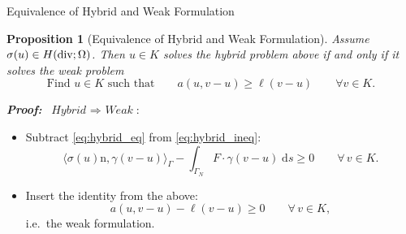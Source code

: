 \documentclass[10pt,aspectratio=169]{beamer}
\newtheorem{proposition}{Proposition}[section]
\def\d{{\mathrm{d}}}
\def\ds{{\d s}}
\newcommand{\diver}{\operatornamewithlimits{div}}
\begin{document}
\begin{frame}{Equivalence of Hybrid and Weak Formulation}
	\begin{proposition}[Equivalence of Hybrid and Weak Formulation]
		Assume $\sigma(u)\in H(\diver;\Omega)$. Then $u\in K$ solves the hybrid problem above if and only if it solves the weak problem
		\begin{equation*}
			\text{Find }u\in K\text{ such that}\qquad a(u,v-u)\ge\ell(v-u)\qquad \forall v\in K.
		\end{equation*}
	\end{proposition}
	\textbf{\em Proof:} $\ \textit{Hybrid }\Rightarrow\textit{ Weak}$:
	\begin{itemize}
		\item Subtract \eqref{eq:hybrid_eq} from \eqref{eq:hybrid_ineq}:
		      \begin{equation*}
			      \langle \sigma(u)\mathrm n,\gamma (v-u)\rangle_\Gamma - \int_{\Gamma_N}F\cdot \gamma (v-u)\;\ds \ge 0\qquad\forall\, v\in K.
		      \end{equation*}
		\item Insert the identity from the above:
		      \begin{equation*}
			      a(u,v-u)-\ell(v-u)\ge 0
			      \qquad\forall\,v\in K,
		      \end{equation*}
		      i.e.\ the weak formulation.
	\end{itemize}
\end{frame}
\end{document}
